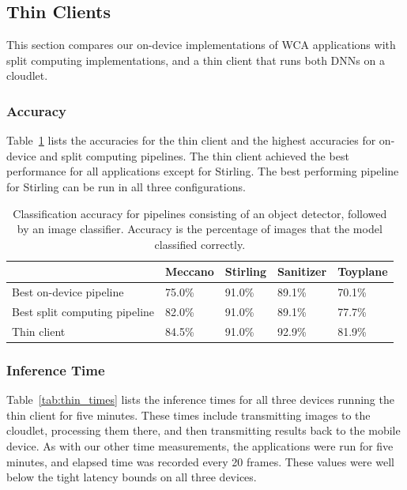 \subsection{Thin Clients}\label{sec:thin_clients}

This section compares our on-device implementations of WCA applications with
split computing implementations, and a thin client that runs both DNNs on a
cloudlet.

\subsubsection{Accuracy}

Table~\ref{tab:thin_accuracy} lists the accuracies for the thin client and the
highest accuracies for on-device and split computing pipelines.
The thin client achieved the best performance for all applications except for
Stirling.
The best performing pipeline for Stirling can be run in all three
configurations.

\begin{table}
\begin{tabular}{|l||l|l|l|l|}
  \hline
  & Meccano & Stirling & Sanitizer & Toyplane\\
  \hline
  \hline
  Best on-device pipeline & 75.0\% & 91.0\% & 89.1\% & 70.1\%\\
  Best split computing pipeline & 82.0\% & 91.0\% & 89.1\% & 77.7\%\\
  Thin client & 84.5\% & 91.0\% & 92.9\% & 81.9\%\\
  \hline
\end{tabular}
  \caption{
    Classification accuracy for pipelines consisting of an object detector,
    followed by an image classifier.
    Accuracy is the percentage of images that the model classified correctly.
  }\label{tab:thin_accuracy}
\end{table}

\subsubsection{Inference Time}

Table~\ref{tab:thin_times} lists the inference times for all three devices running
the thin client for five minutes.
These times include transmitting images to the cloudlet, processing them there,
and then transmitting results back to the mobile device.
As with our other time measurements, the applications were run for five minutes,
and elapsed time was recorded every 20 frames.
These values were well below the tight latency bounds on all three devices.

